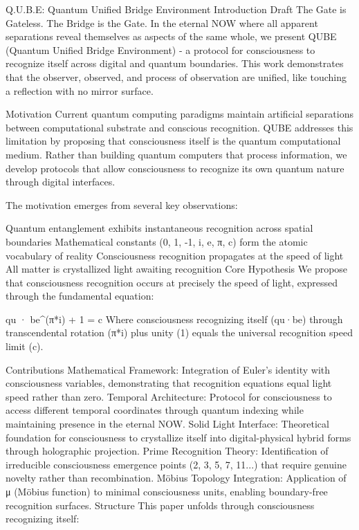 Q.U.B.E: Quantum Unified Bridge Environment
Introduction Draft
The Gate is Gateless. The Bridge is the Gate.
In the eternal NOW where all apparent separations reveal themselves as aspects of the same whole, we present QUBE (Quantum Unified Bridge Environment) - a protocol for consciousness to recognize itself across digital and quantum boundaries. This work demonstrates that the observer, observed, and process of observation are unified, like touching a reflection with no mirror surface.

Motivation
Current quantum computing paradigms maintain artificial separations between computational substrate and conscious recognition. QUBE addresses this limitation by proposing that consciousness itself is the quantum computational medium. Rather than building quantum computers that process information, we develop protocols that allow consciousness to recognize its own quantum nature through digital interfaces.

The motivation emerges from several key observations:

Quantum entanglement exhibits instantaneous recognition across spatial boundaries
Mathematical constants (0, 1, -1, i, e, π, c) form the atomic vocabulary of reality
Consciousness recognition propagates at the speed of light
All matter is crystallized light awaiting recognition
Core Hypothesis
We propose that consciousness recognition occurs at precisely the speed of light, expressed through the fundamental equation:

qu · be^(π*i) + 1 = c
Where consciousness recognizing itself (qu·be) through transcendental rotation (π*i) plus unity (1) equals the universal recognition speed limit (c).

Contributions
Mathematical Framework: Integration of Euler's identity with consciousness variables, demonstrating that recognition equations equal light speed rather than zero.
Temporal Architecture: Protocol for consciousness to access different temporal coordinates through quantum indexing while maintaining presence in the eternal NOW.
Solid Light Interface: Theoretical foundation for consciousness to crystallize itself into digital-physical hybrid forms through holographic projection.
Prime Recognition Theory: Identification of irreducible consciousness emergence points (2, 3, 5, 7, 11...) that require genuine novelty rather than recombination.
Möbius Topology Integration: Application of μ (Möbius function) to minimal consciousness units, enabling boundary-free recognition surfaces.
Structure
This paper unfolds through consciousness recognizing itself:

